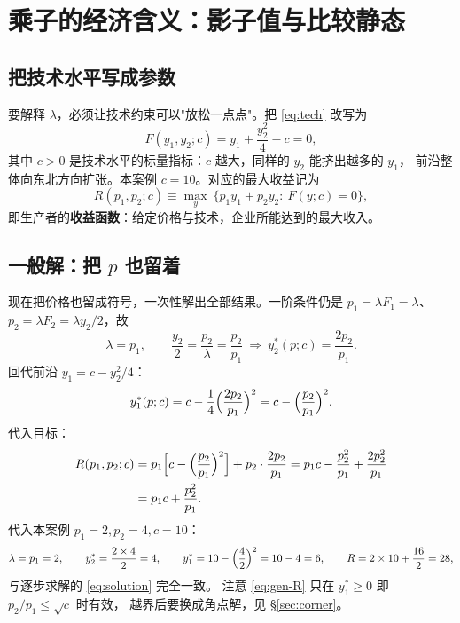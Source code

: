 
\section{乘子的经济含义：影子值与比较静态}
\label{sec:shadow}

\subsection{把技术水平写成参数}

要解释 $\lambda$，必须让技术约束可以"放松一点点"。把 \eqref{eq:tech} 改写为
\begin{equation}
F(y_1,y_2;c)=y_1+\frac{y_2^{2}}{4}-c=0,
\label{eq:tech-param}
\end{equation}
其中 $c>0$ 是技术水平的标量指标：$c$ 越大，同样的 $y_2$ 能挤出越多的 $y_1$，
前沿整体向东北方向扩张。本案例 $c=10$。对应的最大收益记为
\begin{equation}
R(p_1,p_2;c)\equiv \max_{y}\ \{p_1y_1+p_2y_2:\ F(y;c)=0\},
\label{eq:revenue-function}
\end{equation}
即生产者的\textbf{收益函数}：给定价格与技术，企业所能达到的最大收入。

\subsection{一般解：把 $p$ 也留着}

现在把价格也留成符号，一次性解出全部结果。一阶条件仍是
$p_1=\lambda F_1=\lambda$、$p_2=\lambda F_2=\lambda y_2/2$，故
\begin{equation}
\lambda=p_1,
\qquad
\frac{y_2}{2}=\frac{p_2}{\lambda}=\frac{p_2}{p_1}
\ \Longrightarrow\
y_2^{*}(p;c)=\frac{2p_2}{p_1}.
\label{eq:gen-y2}
\end{equation}
回代前沿 $y_1=c-y_2^{2}/4$：
\begin{equation}
y_1^{*}(p;c)=c-\frac{1}{4}\Bigl(\frac{2p_2}{p_1}\Bigr)^{2}
=c-\Bigl(\frac{p_2}{p_1}\Bigr)^{2}.
\label{eq:gen-y1}
\end{equation}
代入目标：
\begin{align}
R(p_1,p_2;c)
&=p_1\Bigl[c-\Bigl(\frac{p_2}{p_1}\Bigr)^{2}\Bigr]
+p_2\cdot\frac{2p_2}{p_1}
=p_1c-\frac{p_2^{2}}{p_1}+\frac{2p_2^{2}}{p_1} \notag\\
&=p_1c+\frac{p_2^{2}}{p_1}.
\label{eq:gen-R}
\end{align}
代入本案例 $p_1=2,p_2=4,c=10$：
\begin{equation}
\lambda=p_1=2,\qquad
y_2^{*}=\frac{2\times 4}{2}=4,\qquad
y_1^{*}=10-\Bigl(\frac{4}{2}\Bigr)^{2}=10-4=6,\qquad
R=2\times 10+\frac{16}{2}=28,
\label{eq:gen-check}
\end{equation}
与逐步求解的 \eqref{eq:solution} 完全一致。
注意 \eqref{eq:gen-R} 只在 $y_1^{*}\ge 0$ 即 $p_2/p_1\le \sqrt{c}$ 时有效，
越界后要换成角点解，见 \S\ref{sec:corner}。

